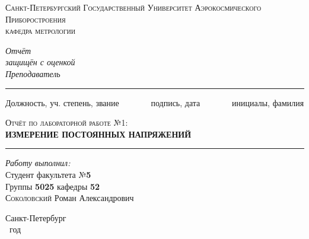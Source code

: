\newcommand{\HRule}{\rule{\linewidth}{0.5mm}}
\begin{titlepage}
\begin{center}
\textsc{\large Санкт-Петербургский Государственный
Университет Аэрокосмического Приборостроения}\\[2cm]
\textsc{\large кафедра метрологии}
\\[2cm]

 \begin{flushleft} \large
  \emph{Отчёт} \\
   \emph{защищён с оценкой}
   \\[0.5cm]
   \emph{Преподаватель}\\[-3mm]
   \HRule
\end{flushleft}
\begin{flushright}
\vspace{-6 pt}
{\small
Должность, уч. степень, звание
\ \ \ \ \ \ \
подпись, дата
\ \ \ \ \ \ \
инициалы, фамилия }\\[10mm]
\end{flushright}

\textsc{\Large Отчёт по лабораторной работе №1:} \\[1cm]
{\Large \bfseries ИЗМЕРЕНИЕ ПОСТОЯННЫХ НАПРЯЖЕНИЙ}\\[1cm]

\HRule
\vspace{5 pt}
\begin{flushright}
    \begin{minipage}{0.5\textwidth}
        \begin{flushright} 
            \large
            \emph{Работу выполнил:}\\
            Студент факультета №\textbf{5}\\
            Группы \textbf{5025} кафедры \textbf{52}\\[2pt]
            \textsc{Соколовский} \textsc{Р}оман \textsc{А}лександрович
        \end{flushright}
    \end{minipage}
\end{flushright}

\vfill
Санкт-Петербург\\
\the\year~год
\end{center}
\end{titlepage}
